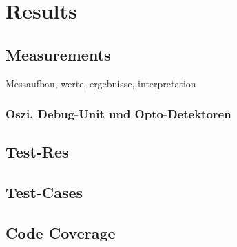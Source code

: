 \documentclass[master,english,smartquotes,apa]{hgbthesis}
\begin{document}
			\subsection{}
	
	\chapter{Results}
	\label{cha:Results}
	\section{Measurements}
		Messaufbau, werte, ergebnisse, interpretation
		\subsection{Oszi, Debug-Unit und Opto-Detektoren}
		\section{Test-Res}
		\section{Test-Cases}
		\section{Code Coverage}
\end{document}
